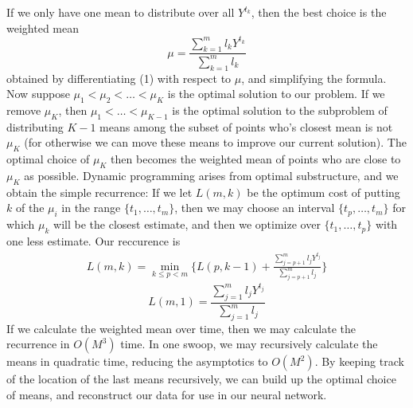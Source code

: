 \documentclass{article}
\begin{document}
If we only have one mean to distribute over all $Y^{t_k}$, then the best choice is the weighted mean
%
\[ \mu = \frac{\sum_{k = 1}^m l_k Y^{t_k}}{\sum_{k = 1}^m l_k} \]
%
obtained by differentiating (1) with respect to $\mu$, and simplifying the formula. Now suppose $\mu_1 < \mu_2 < \dots < \mu_K$ is the optimal solution to our problem. If we remove $\mu_K$, then $\mu_1 < \dots < \mu_{K-1}$ is the optimal solution to the subproblem of distributing $K-1$ means among the subset of points who's closest mean is not $\mu_K$ (for otherwise we can move these means to improve our current solution). The optimal choice of $\mu_K$ then becomes the weighted mean of points who are close to $\mu_K$ as possible. Dynamic programming arises from optimal substructure, and we obtain the simple recurrence: If we let $L(m,k)$ be the optimum cost of putting $k$ of the $\mu_i$ in the range $\{ t_1, \dots, t_m \}$, then we may choose an interval $\{ t_p, \dots, t_m \}$ for which $\mu_k$ will be the closest estimate, and then we optimize over $\{ t_1, \dots, t_p \}$ with one less estimate. Our reccurence is
%
\begin{align*}
    L(m,k) = \min_{k \leq p < m} \bigg\{ L(p,k-1) + \frac{\sum_{j = p+1}^m l_j Y^{t_j}}{\sum_{j = p+1}^m l_j} \bigg\}
\end{align*}
%
\[ L(m,1) = \frac{\sum_{j = 1}^m l_j Y^{t_j}}{\sum_{j = 1}^m l_j} \]
%
If we calculate the weighted mean over time, then we may calculate the recurrence in $O(M^3)$ time. In one swoop, we may recursively calculate the means in quadratic time, reducing the asymptotics to $O(M^2)$. By keeping track of the location of the last means recursively, we can build up the optimal choice of means, and reconstruct our data for use in our neural network.

\end{document}

